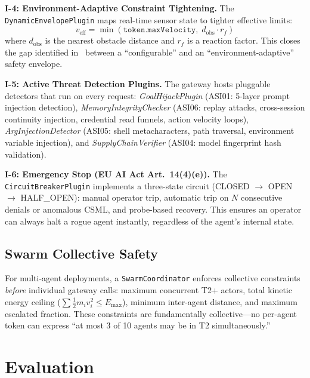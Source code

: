 \documentclass[conference]{IEEEtran}
\begin{document}
\textbf{I-4: Environment-Adaptive Constraint Tightening.}
The \texttt{DynamicEnvelopePlugin} maps real-time sensor state to tighter
effective limits:
\begin{equation}
v_{\text{eff}} = \min\!\left(\texttt{token.maxVelocity},\; d_{\text{obs}} \cdot r_f\right)
\label{eq:dynamic}
\end{equation}
where $d_{\text{obs}}$ is the nearest obstacle distance and $r_f$ is a
reaction factor.
This closes the gap identified in~\cite{rosclaw} between a ``configurable''
and an ``environment-adaptive'' safety envelope.

\textbf{I-5: Active Threat Detection Plugins.}
The gateway hosts pluggable detectors that run on every request:
\emph{GoalHijackPlugin} (ASI01: 5-layer prompt injection detection),
\emph{MemoryIntegrityChecker} (ASI06: replay attacks, cross-session continuity
injection, credential read funnels, action velocity loops),
\emph{ArgInjectionDetector} (ASI05: shell metacharacters, path traversal,
environment variable injection), and
\emph{SupplyChainVerifier} (ASI04: model fingerprint hash validation).

\textbf{I-6: Emergency Stop (EU AI Act Art.~14(4)(e)).}
The \texttt{CircuitBreakerPlugin} implements a three-state circuit
(CLOSED $\to$ OPEN $\to$ HALF\_OPEN):
manual operator trip, automatic trip on $N$ consecutive denials or anomalous
CSML, and probe-based recovery.
This ensures an operator can always halt a rogue agent instantly,
regardless of the agent's internal state.

\subsection{Swarm Collective Safety}

For multi-agent deployments, a \texttt{SwarmCoordinator} enforces collective
constraints \emph{before} individual gateway calls:
maximum concurrent T2+ actors,
total kinetic energy ceiling ($\sum \tfrac{1}{2}m_i v_i^2 \leq E_{\max}$),
minimum inter-agent distance, and maximum escalated fraction.
These constraints are fundamentally collective---no per-agent token can express
``at most 3 of 10 agents may be in T2 simultaneously.''

\section{Evaluation}
\label{sec:eval}
\end{document}
